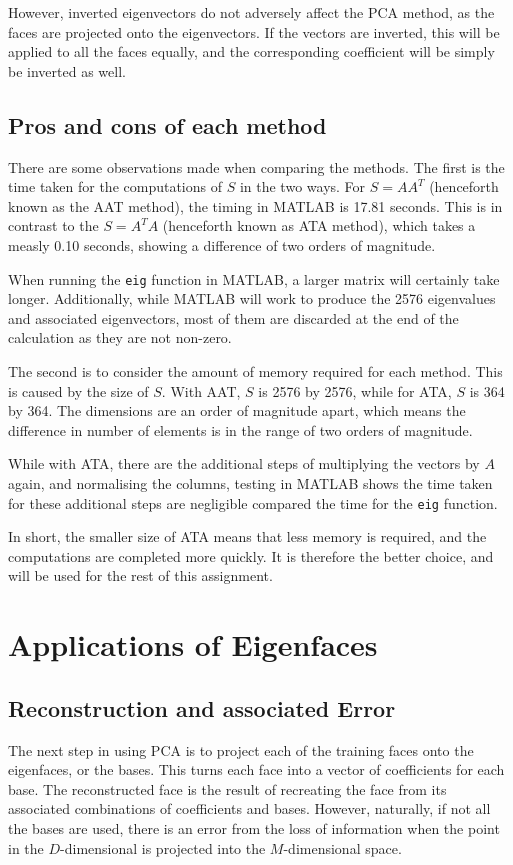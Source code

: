 \documentclass[a4paper, 10pt, conference]{ieeeconf}
\begin{document}
However, inverted eigenvectors do not adversely affect the PCA method, as the faces are projected onto the eigenvectors. If the vectors are inverted, this will be applied to all the faces equally, and the corresponding coefficient will be simply be inverted as well.

\subsection{Pros and cons of each method}
There are some observations made when comparing the methods. The first is the time taken for the computations of $S$ in the two ways. For $S = AA^T$ (henceforth known as the AAT method), the timing in MATLAB is 17.81 seconds. This is in contrast to the $S = A^T A$ (henceforth known as ATA method), which takes a measly 0.10 seconds, showing a difference of two orders of magnitude.

When running the \texttt{eig} function in MATLAB, a larger matrix will certainly take longer. Additionally, while MATLAB will work to produce the 2576 eigenvalues and associated eigenvectors, most of them are discarded at the end of the calculation as they are not non-zero.

The second is to consider the amount of memory required for each method. This is caused by the size of $S$. With AAT, $S$ is 2576 by 2576, while for ATA, $S$ is 364 by 364. The dimensions are an order of magnitude apart, which means the difference in number of elements is in the range of two orders of magnitude.

While with ATA, there are the additional steps of multiplying the vectors by $A$ again, and normalising the columns, testing in MATLAB shows the time taken for these additional steps are negligible compared the time for the \texttt{eig} function.

In short, the smaller size of ATA means that less memory is required, and the computations are completed more quickly. It is therefore the better choice, and will be used for the rest of this assignment.

\section{Applications of Eigenfaces}
\subsection{Reconstruction and associated Error}
The next step in using PCA is to project each of the training faces onto the eigenfaces, or the bases. This turns each face into a vector of coefficients for each base. The reconstructed face is the result of recreating the face from its associated combinations of coefficients and bases. However, naturally, if not all the bases are used, there is an error from the loss of information when the point in the $D$-dimensional is projected into the $M$-dimensional space.
\end{document}
